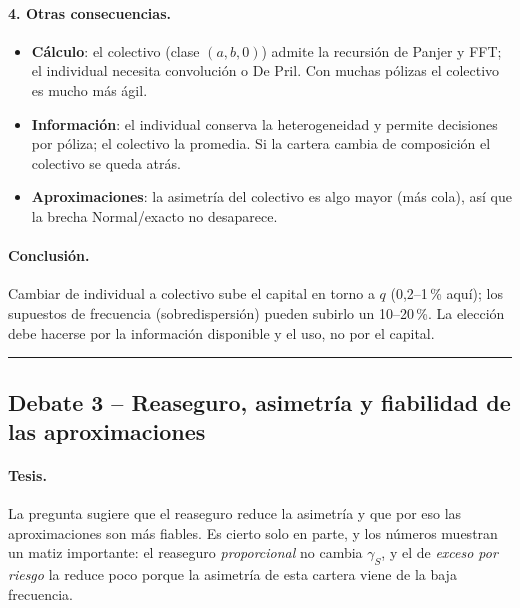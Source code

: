 \documentclass[a4paper,12pt]{article}
\begin{document}
\paragraph{4. Otras consecuencias.}
\begin{itemize}[leftmargin=*,itemsep=1pt]
\item \textbf{C\'alculo}: el colectivo (clase $(a,b,0)$) admite la recursi\'on de Panjer y FFT; el individual necesita convoluci\'on o De Pril. Con muchas p\'olizas el colectivo es mucho m\'as \'agil.
\item \textbf{Informaci\'on}: el individual conserva la heterogeneidad y permite decisiones por p\'oliza; el colectivo la promedia. Si la cartera cambia de composici\'on el colectivo se queda atr\'as.
\item \textbf{Aproximaciones}: la asimetr\'ia del colectivo es algo mayor (m\'as cola), as\'i que la brecha Normal/exacto no desaparece.
\end{itemize}

\paragraph{Conclusi\'on.} Cambiar de individual a colectivo sube el capital en torno a $q$ (0,2--1\,\% aqu\'i); los supuestos de frecuencia (sobredispersi\'on) pueden subirlo un 10--20\,\%. La elecci\'on debe hacerse por la informaci\'on disponible y el uso, no por el capital.

\bigskip\hrule\bigskip

\subsection{Debate 3 -- Reaseguro, asimetr\'ia y fiabilidad de las aproximaciones}

\paragraph{Tesis.} La pregunta sugiere que el reaseguro reduce la asimetr\'ia y que por eso las aproximaciones son m\'as fiables. Es cierto solo en parte, y los n\'umeros muestran un matiz importante: el reaseguro \emph{proporcional} no cambia $\gamma_S$, y el de \emph{exceso por riesgo} la reduce poco porque la asimetr\'ia de esta cartera viene de la baja frecuencia.
\end{document}
